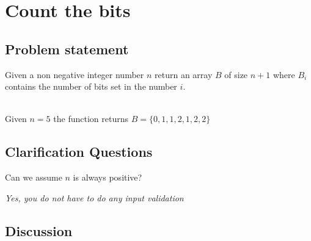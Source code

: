 %



\chapter{Count the bits}
\label{ch:count_bits}

\section{Problem statement}
\begin{exercise}
\label{example:count_bits:exercice1}
Given a non negative integer number $n$ return an array $B$ of size $n+1$ where $B_i$ contains the 
number of bits set in the number $i$.
	\begin{example}
		\label{example:count_bits:example1}
		\hfill \\
		Given $n = 5$ the function returns $B = \{0,1,1,2,1,2,2\}$	
	\end{example}

\end{exercise}

\section{Clarification Questions}

\begin{QandA}
	\item Can we assume $n$ is always positive?
	\begin{answered}
		\textit{Yes, you do not have to do any input validation}
	\end{answered}
	
\end{QandA}

\section{Discussion}
\label{count_bits:sec:discussion}


